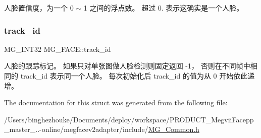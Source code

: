 人脸置信度，为一个 0 $\sim$ 1 之间的浮点数。 超过 0. 表示这确实是一个人脸。 \mbox{\label{struct_m_g___f_a_c_e_a71e1f0316c4696a7a98bd2dfb7b817e0}} 
\subsubsection{\texorpdfstring{track\+\_\+id}{track\_id}}
{\footnotesize\ttfamily M\+G\+\_\+\+I\+N\+T32 M\+G\+\_\+\+F\+A\+C\+E\+::track\+\_\+id}

人脸的跟踪标记。 如果只对单张图做人脸检测则固定返回 -\/1， 否则在不同帧中相同的 track\+\_\+id 表示同一个人脸。 每次初始化后 track\+\_\+id 的值为从 0 开始依此递增。 

The documentation for this struct was generated from the following file\+:\begin{DoxyCompactItemize}
\item 
/\+Users/binghezhouke/\+Documents/deploy/workspace/\+P\+R\+O\+D\+U\+C\+T\+\_\+\+Megvii\+Facepp\+\_\+master\+\_..-\/online/megfacev2adapter/include/\hyperlink{_m_g___common_8h}{M\+G\+\_\+\+Common.\+h}\end{DoxyCompactItemize}
